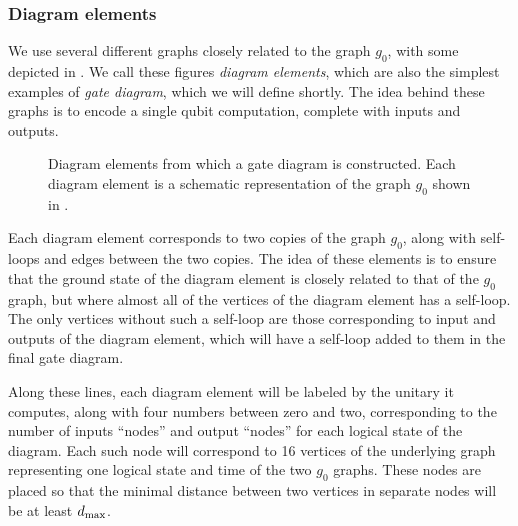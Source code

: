 \documentclass[../thesis-main/thesis-main]{subfiles}
\begin{document}
\subsubsection{Diagram elements}\label{sec:diagram_elements}

We use several different graphs closely related to the graph $g_0$, with some depicted in .  We call these figures \emph{diagram elements}, which are also the simplest examples of \emph{gate diagram}, which we will define shortly.  The idea behind these graphs is to encode a single qubit computation, complete with inputs and outputs. 


\begin{figure}
\centering
\qquad
{} 
\qquad 
{}
\caption{Diagram elements from which a gate diagram is constructed. Each diagram element is a schematic representation of the graph $g_{0}$ shown
in . 
\label{fig:diagram_elements}}
\end{figure}

Each diagram element corresponds to two copies of the graph $g_0$, along with self-loops and edges between the two copies.  The idea of these elements is to ensure that the ground state of the diagram element is closely related to that of the $g_0$ graph, but where almost all of the vertices of the diagram element has a self-loop.  The only vertices without such a self-loop are those corresponding to input and outputs of the diagram element, which will have a self-loop added to them in the final gate diagram.


Along these lines, each diagram element will be labeled by the unitary it computes, along with four numbers between zero and two, corresponding to the number of inputs ``nodes'' and output ``nodes'' for each logical state of the diagram.  Each such node will correspond to 16 vertices of the underlying graph representing one logical state and time of the two $g_0$ graphs.  These nodes are placed so that the minimal distance between two vertices in separate nodes will be at least $d_{\text{max}}$.  
\end{document}
